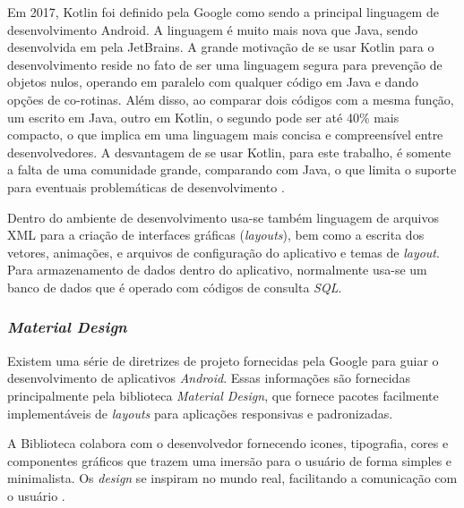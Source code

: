 Em 2017, Kotlin foi definido pela Google como sendo a principal linguagem de desenvolvimento Android. A linguagem é muito mais nova que Java, sendo desenvolvida em pela JetBrains. A grande motivação de se usar Kotlin para o desenvolvimento reside no fato de ser uma linguagem segura para prevenção de objetos nulos, operando em paralelo com qualquer código em Java e dando opções de co-rotinas. Além disso, ao comparar dois códigos com a mesma função, um escrito em Java, outro em Kotlin, o segundo pode ser até 40\% mais compacto, o que implica em uma linguagem mais concisa e compreensível entre desenvolvedores. A desvantagem de se usar Kotlin, para este trabalho, é somente a falta de uma comunidade grande, comparando com Java, o que limita o suporte para eventuais problemáticas de desenvolvimento \cite{site:kotlinxjava}.

Dentro do ambiente de desenvolvimento usa-se também linguagem de arquivos XML para a criação de interfaces gráficas (\textit{layouts}), bem como a escrita dos vetores, animações, e arquivos de configuração do aplicativo e temas de \textit{layout}. Para armazenamento de dados dentro do aplicativo, normalmente usa-se um banco de dados que é operado com códigos de consulta \textit{SQL}.

\subsubsection{\textit{Material Design}}
Existem uma série de diretrizes de projeto fornecidas pela Google para guiar o desenvolvimento de aplicativos \textit{Android}. Essas informações são fornecidas principalmente pela biblioteca \textit{Material Design}, que fornece pacotes facilmente implementáveis de \textit{layouts} para aplicações responsivas e padronizadas.

A Biblioteca colabora com o desenvolvedor fornecendo icones, tipografia, cores e componentes gráficos que trazem uma imersão para o usuário de forma simples e minimalista. Os \textit{design} se inspiram no mundo real, facilitando a comunicação com o usuário \cite{site:materialdesign}.



